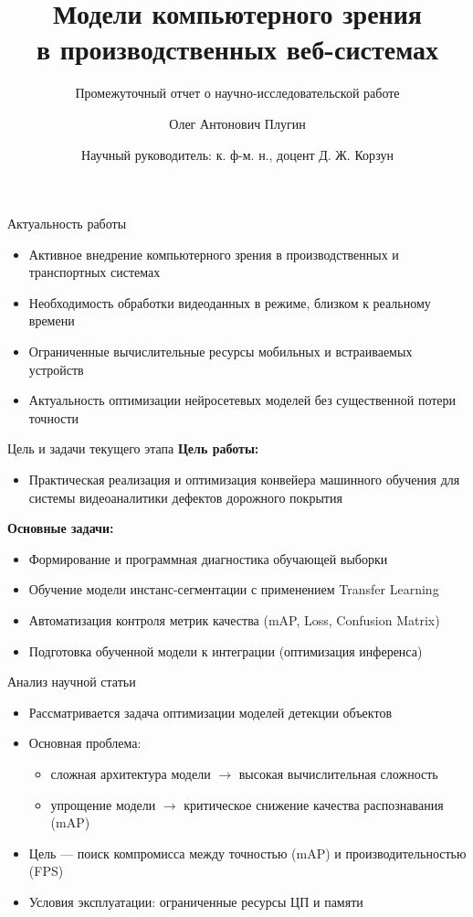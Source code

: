 \documentclass[hyperref={unicode}]{beamer}
\title[%
    Бобры и Интернет
]{%
    Модели компьютерного зрения \\
    в производственных веб-системах
}
\subtitle{Промежуточный отчет о научно-исследовательской работе}
\author[%
    Олег Плугин
]{%
    Олег Антонович Плугин
}
\date[%
    05.06.2026
]{%
    Научный руководитель: к. ф-м. н., доцент Д. Ж. Корзун 
}
\institute[%
    ПетрГУ
]{%
    Петрозаводский государственный университет\\
    Кафедра информатики и математического обеспечения
}
\begin{document}
\begin{frame}
\titlepage
\end{frame}

\begin{frame}{Актуальность работы}
\begin{itemize}
    \item Активное внедрение компьютерного зрения в производственных и транспортных системах
    \item Необходимость обработки видеоданных в режиме, близком к реальному времени
    \item Ограниченные вычислительные ресурсы мобильных и встраиваемых устройств
    \item Актуальность оптимизации нейросетевых моделей без существенной потери точности
\end{itemize}
\end{frame}

\begin{frame}{Цель и задачи текущего этапа}
\textbf{Цель работы:}
\begin{itemize}
    \item Практическая реализация и оптимизация конвейера машинного обучения для системы видеоаналитики дефектов дорожного покрытия
\end{itemize}

\medskip
\textbf{Основные задачи:}
\begin{itemize}
    \item Формирование и программная диагностика обучающей выборки
    \item Обучение модели инстанс-сегментации с применением Transfer Learning
    \item Автоматизация контроля метрик качества (mAP, Loss, Confusion Matrix)
    \item Подготовка обученной модели к интеграции (оптимизация инференса)
\end{itemize}
\end{frame}

\begin{frame}{Анализ научной статьи}
\begin{itemize}
    \item Рассматривается задача оптимизации моделей детекции объектов
    \item Основная проблема:
    \begin{itemize}
        \item сложная архитектура модели $\rightarrow$ высокая вычислительная сложность
        \item упрощение модели $\rightarrow$ критическое снижение качества распознавания (mAP)
    \end{itemize}
    \item Цель — поиск компромисса между точностью (mAP) и производительностью (FPS)
    \item Условия эксплуатации: ограниченные ресурсы ЦП и памяти
\end{itemize}
\end{frame}
\end{document}
